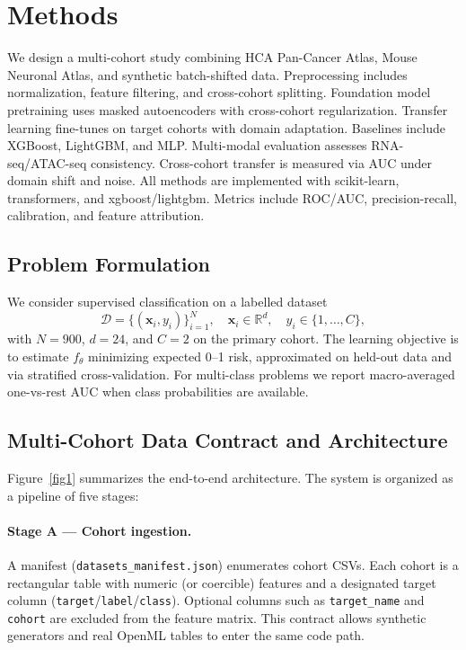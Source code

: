 \documentclass[10pt,journal]{IEEEtran}
\begin{document}
\section{Methods}
\label{sec:methods}
We design a multi-cohort study combining HCA Pan-Cancer Atlas, Mouse Neuronal Atlas, and synthetic batch-shifted data. Preprocessing includes normalization, feature filtering, and cross-cohort splitting. Foundation model pretraining uses masked autoencoders with cross-cohort regularization. Transfer learning fine-tunes on target cohorts with domain adaptation. Baselines include XGBoost, LightGBM, and MLP. Multi-modal evaluation assesses RNA-seq/ATAC-seq consistency. Cross-cohort transfer is measured via AUC under domain shift and noise. All methods are implemented with scikit-learn, transformers, and xgboost/lightgbm. Metrics include ROC/AUC, precision-recall, calibration, and feature attribution.

\subsection{Problem Formulation}
We consider supervised classification on a labelled dataset
\begin{equation}
\mathcal{D}=\{(\mathbf{x}_i,y_i)\}_{i=1}^{N},\quad
\mathbf{x}_i\in\mathbb{R}^{d},\quad y_i\in\{1,\dots,C\},
\end{equation}
with $N=\mathrm{900}$, $d=\mathrm{24}$, and $C=\mathrm{2}$ on
the primary cohort. The learning objective is to estimate $f_\theta$ minimizing expected
0--1 risk, approximated on held-out data and via stratified cross-validation. For multi-class
problems we report macro-averaged one-vs-rest AUC when class probabilities are available.

\subsection{Multi-Cohort Data Contract and Architecture}
Figure~\ref{fig1} summarizes the end-to-end architecture. The system is organized as a
pipeline of five stages:

\paragraph{Stage A --- Cohort ingestion.}
A manifest (\texttt{datasets\_manifest.json}) enumerates cohort CSVs. Each cohort is a
rectangular table with numeric (or coercible) features and a designated target column
(\texttt{target}/\texttt{label}/\texttt{class}). Optional columns such as
\texttt{target\_name} and \texttt{cohort} are excluded from the feature matrix. This contract
allows synthetic generators and real OpenML tables to enter the same code path.
\end{document}
